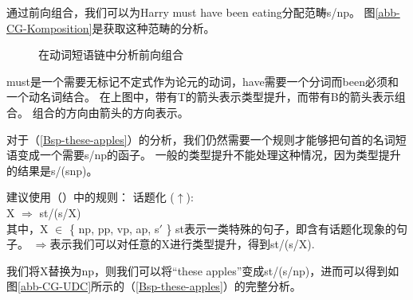通过前向组合，我们可以为Harry must have been eating分配范畴s/np。
图\vref{abb-CG-Komposition}是获取这种范畴的分析。
\begin{figure}
\centerline{%
}
\caption{\label{abb-CG-Komposition}在动词短语链中分析前向组合}
\end{figure}%
must是一个需要无标记不定式作为论元的动词，have需要一个分词而been必须和一个动名词结合。
在上图中，带有T的箭头表示类型提升，而带有B的箭头表示组合。
组合的方向由箭头的方向表示。

对于（\ref{Bsp-these-apples}）的分析，我们仍然需要一个规则才能够把句首的名词短语变成一个需要s/np的函子。
一般的类型提升不能处理这种情况，因为类型提升的结果是s/(s\bs np)。

 \citet[]{Steedman89a}建议使用（）中的规则：
\ea
\label{Regel-Topikalisierung}
话题化
 ($\uparrow$\isc{$\uparrow$}\is{$\uparrow$}):\\
X $\Rightarrow$ st/(s/X)\\
其中，X $\in$ \{ np, pp, vp, ap, s$'$ \}
\z
st表示一类特殊的句子，即含有话题化现象的句子。
$\Rightarrow$表示我们可以对任意的X进行类型提升，得到st/(s/X). 

我们将X替换为np，则我们可以将“these apples”变成st/(s/np)，进而可以得到如图\vref{abb-CG-UDC}所示的（\ref{Bsp-these-apples}）的完整分析。

